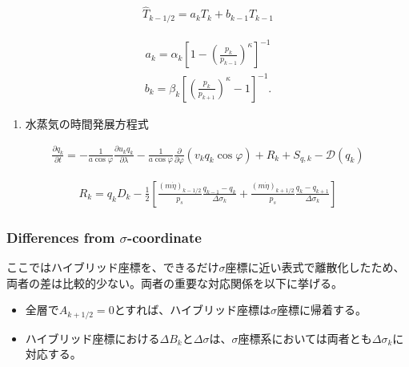 \begin{eqnarray}
  \hat{T}_{k-1/2}
   = a_k T_k + b_{k-1} T_{k-1}
\end{eqnarray}

\begin{eqnarray}
  a_k  =  \alpha_k
              \left[ 1- \left( \frac{ p_k }{ p_{k-1} }
                        \right)^{\kappa} \right]^{-1}
\end{eqnarray} \begin{eqnarray}
  b_k  =  \beta_k 
              \left[ \left( \frac{ p_k }{ p_{k+1} } 
                     \right)^{\kappa} - 1 \right]^{-1} .  
\end{eqnarray}

\begin{enumerate}
\def\labelenumi{\arabic{enumi}.}
\setcounter{enumi}{4}
\tightlist
\item
  水蒸気の時間発展方程式
\end{enumerate}

\begin{eqnarray}
  \frac{\partial q_k}{\partial t}
      =   - \frac{1}{a\cos\varphi} 
               \frac{\partial u_k q_k}{\partial \lambda}
          - \frac{1}{a\cos\varphi}
               \frac{\partial }{\partial \varphi} ( v_k q_k\cos\varphi)
          + R_k 
          + S_{q,k}
          - {\mathcal D}(q_k) 
\end{eqnarray}

\begin{eqnarray}
R_k  =  q_k D_k 
       - \frac{1}{2} 
             \left[   \frac{(m\dot{\eta})_{k-1/2}}{p_s} \frac{q_{k-1} - q_k}{\Delta\sigma_k}
               + \frac{(m\dot{\eta})_{k+1/2}}{p_s} \frac{q_k   - q_{k+1}}{\Delta\sigma_k} \right]
\end{eqnarray}

\hypertarget{differences-from-sigma-coordinate}{%
\subsubsection{\texorpdfstring{Differences from
\(\sigma\)-coordinate}{Differences from \textbackslash sigma-coordinate}}\label{differences-from-sigma-coordinate}}

ここではハイブリッド座標を、できるだけ\(\sigma\)座標に近い表式で離散化したため、両者の差は比較的少ない。両者の重要な対応関係を以下に挙げる。

\begin{itemize}
\tightlist
\item
  全層で\(A_{k+1/2}=0\)とすれば、ハイブリッド座標は\(\sigma\)座標に帰着する。
\item
  ハイブリッド座標における\(\Delta B_k\)と\(\Delta \sigma\)は、\(\sigma\)座標系においては両者とも\(\Delta \sigma_k\)に対応する。
\end{itemize}
